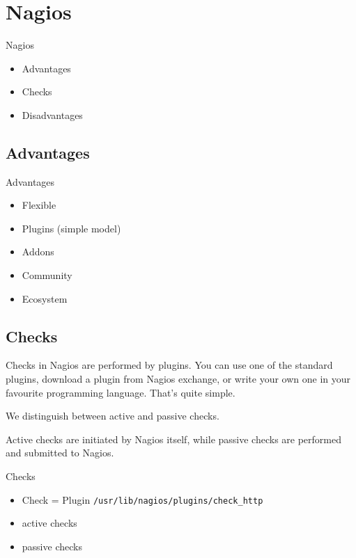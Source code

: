 \section{Nagios}

\begin{frame}[fragile]{Nagios}
\begin{itemize}
\item Advantages
\item Checks
\item Disadvantages
\end{itemize}
\end{frame}

\subsection{Advantages}
\begin{frame}[fragile]{Advantages}
\begin{itemize}
\item Flexible
\item Plugins (simple model)
\item Addons
\item Community
\item Ecosystem
\end{itemize}
\end{frame}

\subsection{Checks}
Checks in Nagios are performed by plugins.
You can use one of the standard plugins, download a plugin
from Nagios exchange, or write your own one in your
favourite programming language. That's quite simple.

We distinguish between active and passive checks.

Active checks are initiated by Nagios itself,
while passive checks are performed and submitted
to Nagios.

\begin{frame}[fragile]{Checks}
\begin{itemize}
\item Check = Plugin
\verb|/usr/lib/nagios/plugins/check_http|
\end{itemize}

\begin{itemize}
\item active checks
\item passive checks
\end{itemize}

\end{frame}

